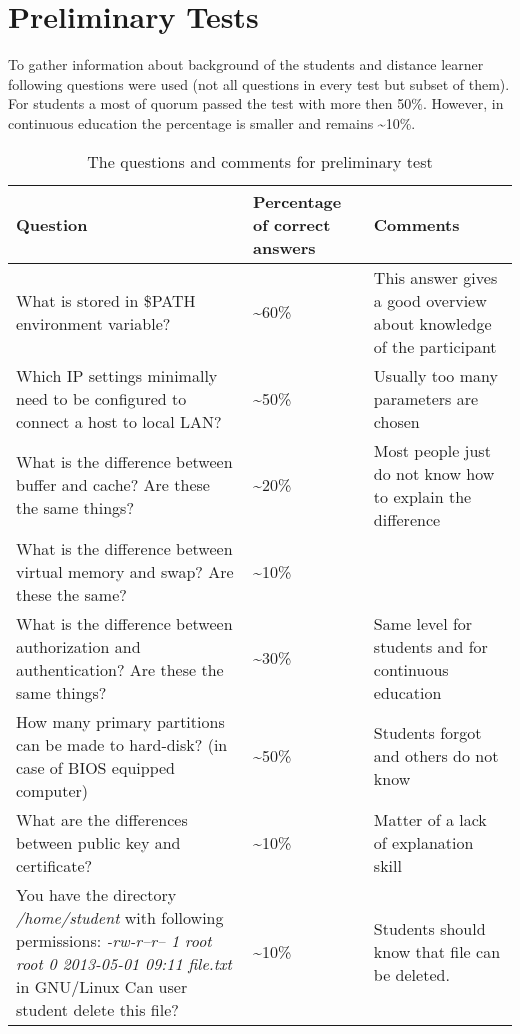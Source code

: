 \chapter{Preliminary Tests}
\label{Preliminary Tests}

To gather information about background of the students and distance learner following questions were used (not all questions in every test but subset of them). For students a most of quorum passed the test with more then 50\%. However, in continuous education the percentage is smaller and remains \textasciitilde 10\%. 

\begin{table}[h]
\centering
\caption{The questions and comments for preliminary test}

\begin{tabular}{|p{7cm}|p{2cm}|p{5cm}|}
\hline 
\color{blue}
Question & \color{blue} Percentage of correct answers & \color{blue} Comments \\ 
\hline 
What is stored in \$PATH environment variable? & \textasciitilde 60\% & This answer gives a good overview about knowledge of the participant \\ 
\hline 
Which IP settings minimally  need to be configured to connect a host to local LAN? & \textasciitilde 50\% & Usually too many  parameters are chosen\\ 
\hline 
What is the difference between buffer and cache? Are these the same things? &\textasciitilde 20\% & Most people just do not know how to explain the difference  \\ 
\hline 
What is the difference between virtual memory and swap? Are these the same? & \textasciitilde 10\%  &   \\ 
\hline 
What is the difference between authorization and authentication? Are these the same things? & \textasciitilde 30\% & Same level for students and  for continuous education \\ 
\hline 
How many primary partitions can be made to hard-disk? (in case of BIOS equipped computer) & \textasciitilde 50\% & Students forgot and others do not know  \\ 
\hline 
What are the differences between public key and certificate?  & \textasciitilde 10\% & Matter of a lack of explanation skill \\ 
\hline 
You have the directory
 \emph{/home/student} with following permissions: 
 \emph{-rw-r--r-- 1 root root 0 2013-05-01 09:11 file.txt}
 in \gls{GNU/Linux} Can user student delete this file? &  \textasciitilde 10\% &Students should know that file can be deleted.  \\ 
\hline 
\end{tabular} 

\label{tab:preliminary_test}
\end{table}

